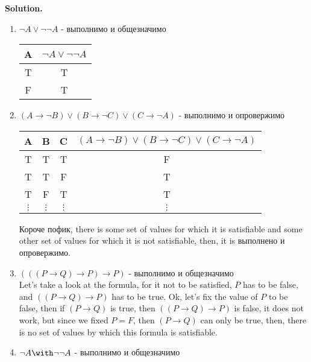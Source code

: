 \documentclass{article}
\begin{document}
\begin{enumerate}
    \textbf{Solution.}
    \begin{enumerate}
        \item $\neg A\vee\neg\neg A$ - выполнимо и общезначимо
        \begin{center}
            \begin{tabular}{| c | c |}
                \hline
                A & $\neg A \vee\neg\neg A$ \\
                \hline
                T & T \\
                \hline
                F & T \\
                \hline
            \end{tabular}
        \end{center}
        \item $(A\rightarrow\neg B)\vee(B\rightarrow\neg C)\vee(C\rightarrow\neg A)$ - выполнимо и опровержимо
        \begin{center}
            \begin{tabular}{| c | c | c | c |}
                \hline
                A & B & C & $(A\rightarrow\neg B)\vee(B\rightarrow\neg C)\vee(C\rightarrow\neg A)$ \\
                \hline
                T & T & T & F \\
                \hline
                T & T & F & T \\
                \hline
                T & F & T & T \\
                \hline
                $\vdots$ & $\vdots$ & $\vdots$ & $\vdots$ \\
                \hline
            \end{tabular}
        \end{center}
        Короче пофик, there is some set of values for which it is satisfiable and some other set of values for which it is not satisfiable, then, it is выполнено и опровержимо.
        \item $(((P\rightarrow Q)\rightarrow P)\rightarrow P)$ - выполнимо и общезначимо \\
        Let's take a look at the formula, for it not to be satisfied, $P$ has to be false, and $((P \rightarrow Q) \rightarrow P)$ has to be true. Ok, let's fix the value of $P$ to be false, then if $(P \rightarrow Q)$ is true, then $((P \rightarrow Q) \rightarrow P)$ is false, it does not work, but since we fixed $P=F$, then $(P \rightarrow Q)$ can only be true, then, there is no set of values by which this formula is satisfiable.  
        \item $\neg A \with \neg \neg A$ - выполнимо и общезначимо \\

\end{enumerate}
\end{enumerate}
\end{document}
